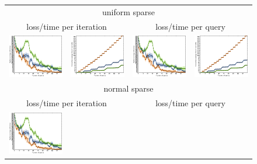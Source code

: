 \documentclass{article}
\renewcommand\[{\begin{equation}}
\renewcommand\]{\end{equation}}
\begin{document}
\begin{figure}[b]
    \centering
    {\footnotesize
    \begin{tabular}{cccc}
        \hline
        \multicolumn{4}{c}{{\sc uniform sparse}}
        \\
        \multicolumn{2}{c}{{\sc loss/time per iteration}} &
        \multicolumn{2}{c}{{\sc loss/time per query}}
        \\
        \includegraphics[width=10em]{figures/loss} &
        \includegraphics[width=10em]{figures/time} &
        \includegraphics[width=10em]{figures/loss} &
        \includegraphics[width=10em]{figures/time}
        \\
        \hline
        \multicolumn{4}{c}{{\sc normal sparse}}
        \\
        \multicolumn{2}{c}{{\sc loss/time per iteration}} &
        \multicolumn{2}{c}{{\sc loss/time per query}}
        \\
        \includegraphics[width=10em]{figures/loss} &

\end{tabular}}
\end{figure}
\end{document}
